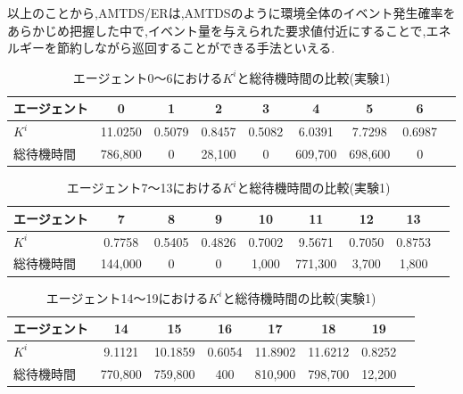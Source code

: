 \documentclass[12pt,a4j,twoside]{jarticle}
\begin{document}
  \par
  以上のことから,AMTDS/ERは,AMTDSのように環境全体のイベント発生確率をあらかじめ把握した中で,イベント量を与えられた要求値付近にすることで,エネルギーを節約しながら巡回することができる手法といえる.

  \begin{table}
    \centering
    \caption{エージェント0～6における$K^i$と総待機時間の比較(実験1)}
    \begin{tabular}{lcccccccr}\\ \hline
      エージェント & 0 & 1 & 2 & 3 & 4 & 5 & 6 \\ \hline
      $K^i$ & 11.0250 & 0.5079 & 0.8457 & 0.5082 & 6.0391 & 7.7298 & 0.6987 \\ \hline
      総待機時間 & 786,800 & 0 & 28,100 & 0 & 609,700 & 698,600 & 0 \\ \hline      
    \end{tabular}
    \label{tb:ER_Office_k1}
  \end{table}

  \begin{table}
    \centering
    \caption{エージェント7～13における$K^i$と総待機時間の比較(実験1)}
    \begin{tabular}{lcccccccr}\\ \hline
      エージェント & 7 & 8 & 9 & 10 & 11 & 12 & 13 \\ \hline
      $K^i$  & 0.7758 & 0.5405 & 0.4826 & 0.7002 & 9.5671 & 0.7050 & 0.8753 \\ \hline
      総待機時間 & 144,000 & 0 & 0 & 1,000 & 771,300 & 3,700 & 1,800 \\ \hline      
    \end{tabular}
    \label{tb:ER_Office_k2}
  \end{table}

  \begin{table}
    \centering
    \caption{エージェント14～19における$K^i$と総待機時間の比較(実験1)}
    \begin{tabular}{lccccccr}\\ \hline
      エージェント & 14 & 15 & 16 & 17 & 18 & 19 \\ \hline
      $K^i$  & 9.1121 & 10.1859 & 0.6054 & 11.8902 & 11.6212 & 0.8252 \\ \hline
      総待機時間 & 770,800 & 759,800 & 400 & 810,900 & 798,700 & 12,200 \\ \hline      
    \end{tabular}
    \label{tb:ER_Office_k3}
  \end{table}
\end{document}
